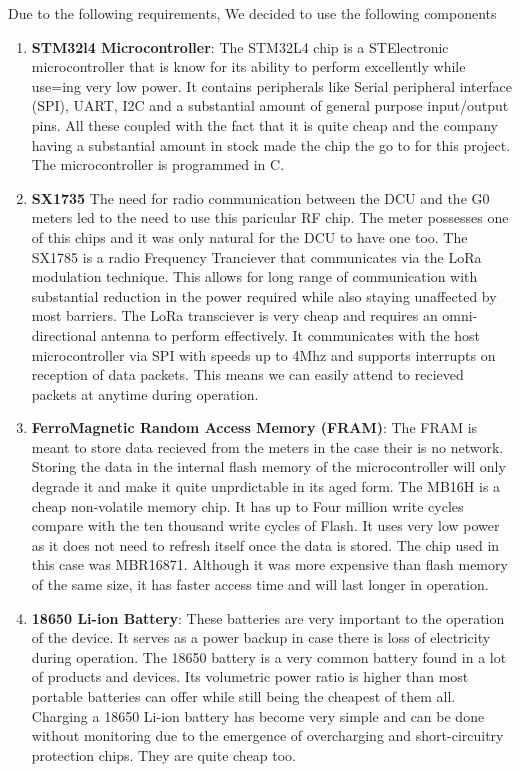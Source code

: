 Due to the following requirements, We decided to use the following components
\begin{enumerate}
\item \textbf{STM32l4 Microcontroller}: The STM32L4 chip is a STElectronic microcontroller that is know for its ability to perform excellently while use=ing very low power. It contains peripherals like Serial peripheral interface (SPI), UART, I2C and a substantial amount of general purpose input/output pins. All these coupled with the fact that it is quite cheap and the company having a substantial amount in stock made the chip the go to for this project. The microcontroller is programmed in C.
\item \textbf{SX1735} The need for radio communication between the DCU and the G0 meters led to the need to use this paricular RF chip. The meter possesses one of this chips and it was only natural for the DCU to have one too. The SX1785 is a radio Frequency Tranciever that communicates via the LoRa modulation technique. This allows for long range of communication with substantial reduction in the power required while also staying unaffected by most barriers.  The LoRa transciever is very cheap and requires an omni-directional antenna to perform effectively. It communicates with the host microcontroller via SPI with speeds up to 4Mhz and supports interrupts on reception of data packets. This means we can easily attend to recieved packets at anytime during operation.

\item \textbf{FerroMagnetic Random Access Memory (FRAM)}: The FRAM is meant to store data recieved from the meters in the case their is no network. Storing the data in the internal flash memory of the microcontroller will only degrade it and make it quite unprdictable in its aged form. The MB16H is a cheap non-volatile memory chip. It has up to Four million write cycles compare with the ten thousand write cycles of Flash. It uses very low power as it does not need to refresh itself once the data is stored. The chip used in this case was MBR16871. Although it was more expensive than flash memory of the same size, it has faster access time and will last longer in operation. 

\item \textbf{18650 Li-ion Battery}: These batteries are very important to the operation of the device. It serves as a power backup in case there is loss of electricity during operation. The 18650 battery is a very common battery found in a lot of products and devices. Its volumetric power ratio is higher than most portable batteries can offer while still being the cheapest of them all. Charging a 18650 Li-ion battery has become very simple and can be done without monitoring due to the emergence of overcharging and short-circuitry protection chips.  They are quite cheap too. 


\end{enumerate}

